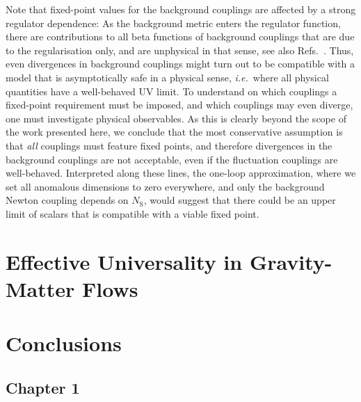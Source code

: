 \documentclass[11pt]{book}
\newcommand\NS{ N_{\scriptscriptstyle{\mathrm{S}}} }
\newcommand\ie{\textit{i.e.}\ }
\numberwithin{equation}{chapter}
\begin{document}
Note that fixed-point values for the background couplings are affected by a strong regulator dependence:
As the background metric enters the regulator function,
there are contributions to all beta functions of background couplings that are due to the regularisation only,
and are unphysical in that sense, see also
Refs.~\cite{Folkerts:2011jz, Litim:2002ce, Litim:2002hj, Bridle:2013sra}.
Thus, even divergences in background couplings might turn out to be compatible with a model that
is asymptotically safe in a physical sense, \ie where all physical quantities have a well-behaved UV limit.
To understand on which couplings a fixed-point requirement must be imposed,
and which couplings may even diverge, one must investigate physical observables.
As this is clearly beyond the scope of the work presented here, we conclude that the most conservative
assumption is that \emph{all} couplings must feature fixed points,
and therefore divergences in the background couplings are not acceptable,
even if the fluctuation couplings are well-behaved. Interpreted along these lines,
the one-loop approximation, where we set all anomalous dimensions to zero everywhere,
and only the background Newton coupling depends on $\NS$,
would suggest that there could be an upper limit of scalars that is compatible with a viable fixed point.




\chapter{Effective Universality in Gravity-Matter Flows}
\label{ch:jan}




\chapter*{Conclusions}

\section*{Chapter 1}
\end{document}
